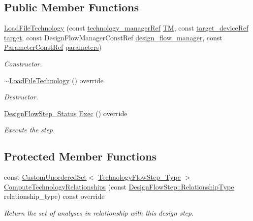 \subsection*{Public Member Functions}
\begin{DoxyCompactItemize}
\item 
\hyperlink{classLoadFileTechnology_a29819bebe9045c9f58a59983fd14beda}{Load\+File\+Technology} (const \hyperlink{technology__manager_8hpp_a4b9ecd440c804109c962654f9227244e}{technology\+\_\+manager\+Ref} \hyperlink{classTechnologyFlowStep_a4aeea30129ed65348c3bad932b3a135b}{TM}, const \hyperlink{target__device_8hpp_acedb2b7a617e27e6354a8049fee44eda}{target\+\_\+device\+Ref} \hyperlink{classTechnologyFlowStep_a1a16880c55bddc3f9dbc495636d7a8cb}{target}, const Design\+Flow\+Manager\+Const\+Ref \hyperlink{classDesignFlowStep_ab770677ddf087613add30024e16a5554}{design\+\_\+flow\+\_\+manager}, const \hyperlink{Parameter_8hpp_a37841774a6fcb479b597fdf8955eb4ea}{Parameter\+Const\+Ref} \hyperlink{classDesignFlowStep_a802eaafe8013df706370679d1a436949}{parameters})
\begin{DoxyCompactList}\small\item\em Constructor. \end{DoxyCompactList}\item 
\hyperlink{classLoadFileTechnology_a7ab754beea7b31089c6b7a5eff8fb5c9}{$\sim$\+Load\+File\+Technology} () override
\begin{DoxyCompactList}\small\item\em Destructor. \end{DoxyCompactList}\item 
\hyperlink{design__flow__step_8hpp_afb1f0d73069c26076b8d31dbc8ebecdf}{Design\+Flow\+Step\+\_\+\+Status} \hyperlink{classLoadFileTechnology_a5059ff57d50028e3eb11cc0e77451034}{Exec} () override
\begin{DoxyCompactList}\small\item\em Execute the step. \end{DoxyCompactList}\end{DoxyCompactItemize}
\subsection*{Protected Member Functions}
\begin{DoxyCompactItemize}
\item 
const \hyperlink{classCustomUnorderedSet}{Custom\+Unordered\+Set}$<$ \hyperlink{technology__flow__step_8hpp_a65208cfec963a7d7def292f9db428292}{Technology\+Flow\+Step\+\_\+\+Type} $>$ \hyperlink{classLoadFileTechnology_ae698944e39fc273e5821302bbc45e62e}{Compute\+Technology\+Relationships} (const \hyperlink{classDesignFlowStep_a723a3baf19ff2ceb77bc13e099d0b1b7}{Design\+Flow\+Step\+::\+Relationship\+Type} relationship\+\_\+type) const override
\begin{DoxyCompactList}\small\item\em Return the set of analyses in relationship with this design step. \end{DoxyCompactList}\end{DoxyCompactItemize}
